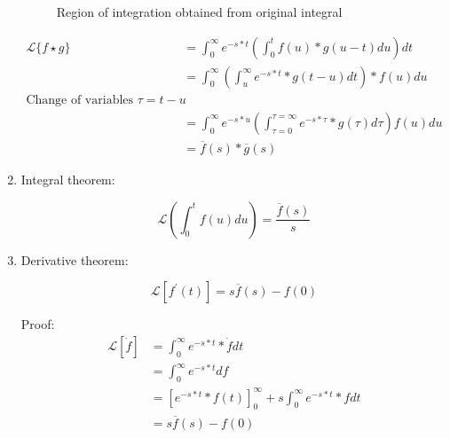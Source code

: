 \documentclass[10pt,a4paper]{article}
\begin{document}
\begin{enumerate}
\begin{figure} [h!]
         \caption{Region of integration obtained from original integral}
     \end{figure}
     \begin{equation*} 
        \begin{aligned} 
            \mathcal{L}\{f\star g\} &= \int_{0}^{\infty} e^{-s*t} \left( \int_{0}^{t} f(u)*g(u-t)du \right) dt \\
            &= \int_{0}^{\infty} \left( \int_{u}^{\infty} e^{-s*t}*g(t-u)dt \right)*f(u) du \\
            \text{Change of variables $\tau = t-u$} \\ 
            &= \int_{0}^{\infty} e^{-s*u} \left( \int_{\tau = 0}^{\tau = \infty} e^{-s*\tau}*g(\tau)d\tau \right) f(u) du \\
            &= \overline{f}(s)*\overline{g}(s)
        \end{aligned}
     \end{equation*}
     
     \item Integral theorem:
     \begin{tcolorbox}[breakable,colback=white,colframe=black,width=\dimexpr\textwidth+12mm\relax,enlarge left by=-6mm]
        \begin{equation*} 
        \mathcal{L}\left(\int_0^t f(u) du\right) = \frac{\overline{f}(s)}{s}
        \end{equation*}
     \end{tcolorbox}

     \item Derivative theorem:
     \begin{tcolorbox}[breakable,colback=white,colframe=black,width=\dimexpr\textwidth+12mm\relax,enlarge left by=-6mm]
        \begin{equation*} 
        \mathcal{L}[ f^{\prime}(t)] = s\overline{f}(s) - f(0)
        \end{equation*}
     \end{tcolorbox}
     Proof: 
     \begin{equation*} 
        \begin{aligned} 
            \mathcal{L}[\dot{f}]&=\int_0^{\infty}e^{-s*t}*\dot{f} dt \\
            &= \int_0^{\infty}e^{-s*t}df \\
            &= \left[e^{-s*t}*f(t)\right]_0^{\infty} + s\int_0^{\infty}e^{-s*t}*f dt \\
            &= s\overline{f}(s) - f(0)
        \end{aligned}
     \end{equation*}


\end{enumerate}
\end{document}
